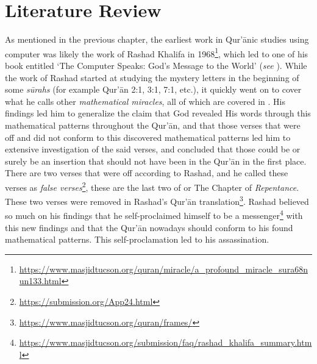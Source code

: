 \chapter{Literature Review}

As mentioned in the previous chapter, the earliest work in Qur'\=anic studies using computer was likely the work of Rashad Khalifa in 1968\footnote{\url{https://www.masjidtucson.org/quran/miracle/a_profound_miracle_sura68nun133.html}}, which led to one of his book entitled `The Computer Speaks: God's Message to the World' (\textit{see} ). While the work of Rashad started at studying the mystery letters in the beginning of some \textit{s\=urahs}  (for example Qur'\=an 2:1, 3:1, 7:1, etc.), it quickly went on to cover what he calls other \textit{mathematical miracles}, all of which are covered in . His findings led him to generalize the claim that God revealed His words through this mathematical patterns throughout the Qur'\=an, and that those verses that were off and did not conform to this discovered mathematical patterns led him to extensive investigation of the said verses, and concluded that those could be or surely be an insertion that should not have been in the Qur'\=an in the first place. There are two verses that were off according to Rashad, and he called these verses as \textit{false verses}\footnote{\url{https://submission.org/App24.html}}, these are the last two   of   or The Chapter of \textit{Repentance}. These two verses were removed in Rashad's Qur'\=an translation\footnote{\url{https://www.masjidtucson.org/quran/frames/}}. Rashad believed so much on his findings that he self-proclaimed himself to be a messenger\footnote{\url{https://www.masjidtucson.org/submission/faq/rashad_khalifa_summary.html}} with this new findings and that the Qur'\=an nowadays should conform to his found mathematical patterns. This self-proclamation led to his assassination.

